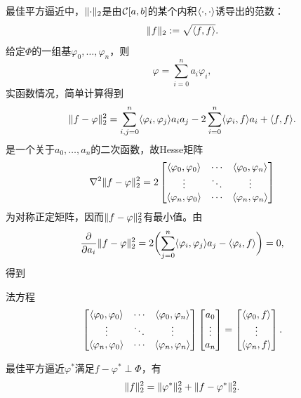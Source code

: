 最佳平方逼近中，$\lVert\cdot\rVert_2$是由$\mathcal{C}[a,b]$的某个内积$\langle\cdot,\cdot\rangle$诱导出的范数：
\[
    \lVert f\rVert_2 := \sqrt{\langle f,f\rangle}.
\]
给定$\Phi$的一组基$\varphi_0,\ldots,\varphi_n$，则
\[
    \varphi = \sum_{i=0}^na_i\varphi_i,
\]
实函数情况，简单计算得到
\[
    \lVert f - \varphi\rVert_2^2 = \sum_{i,j=0}^n\langle\varphi_i,\varphi_j\rangle a_ia_j - 2\sum_{i=0}^n\langle\varphi_i,f\rangle a_i + \langle f,f\rangle.
\]
是一个关于$a_0,\ldots,a_n$的二次函数，故Hesse矩阵
\begin{equation}
    \nabla^2\lVert f - \varphi\rVert_2^2 = 2\begin{bmatrix}
        \langle\varphi_0,\varphi_0\rangle&\cdots&\langle\varphi_0,\varphi_n\rangle\\
        \vdots&\ddots&\vdots\\
        \langle\varphi_n,\varphi_0\rangle&\cdots&\langle\varphi_n,\varphi_n\rangle
    \end{bmatrix}
\end{equation}
为对称正定矩阵，因而$\lVert f - \varphi\rVert_2^2$有最小值。由
\begin{equation*}
    \frac{\partial^{}}{\partial{a_i}^{}}\lVert f - \varphi\rVert_2^2 = 2\biggl(\sum_{j=0}^n\langle\varphi_i,\varphi_j\rangle a_j - \langle\varphi_i,f\rangle\biggr) = 0,
\end{equation*}
得到
\begin{theorem}
    {法方程}{}
    \begin{equation}
        \begin{bmatrix}
            \langle\varphi_0,\varphi_0\rangle&\cdots&\langle\varphi_0,\varphi_n\rangle\\
            \vdots&\ddots&\vdots\\
            \langle\varphi_n,\varphi_0\rangle&\cdots&\langle\varphi_n,\varphi_n\rangle
        \end{bmatrix}\begin{bmatrix}
            a_0\\\vdots\\a_n
        \end{bmatrix} = \begin{bmatrix}
            \langle\varphi_0,f\rangle\\\vdots\\\langle\varphi_n,f\rangle
        \end{bmatrix}.
    \end{equation}
\end{theorem}

\begin{remark}
    最佳平方逼近$\varphi^*$满足$f - \varphi^* \perp \Phi$，有
    \begin{equation}
        \lVert f\rVert_2^2 = \lVert\varphi^*\rVert_2^2 + \lVert f - \varphi^*\rVert_2^2.
    \end{equation}
\end{remark}

